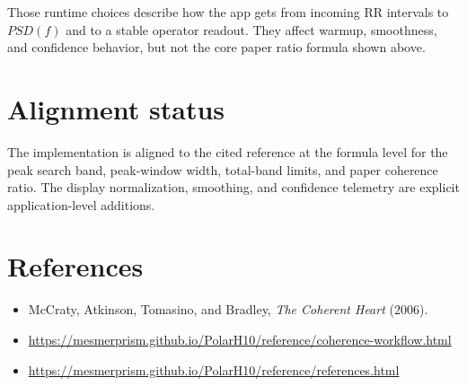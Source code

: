 \documentclass[11pt]{article}
\begin{document}
Those runtime choices describe how the app gets from incoming RR intervals to
$PSD(f)$ and to a stable operator readout. They affect warmup, smoothness, and
confidence behavior, but not the core paper ratio formula shown above.

\section*{Alignment status}

The implementation is aligned to the cited reference at the formula level for
the peak search band, peak-window width, total-band limits, and paper coherence
ratio. The display normalization, smoothing, and confidence telemetry are
explicit application-level additions.

\section*{References}

\begin{itemize}[leftmargin=1.5em]
\item McCraty, Atkinson, Tomasino, and Bradley, \emph{The Coherent Heart} (2006).
\item \url{https://mesmerprism.github.io/PolarH10/reference/coherence-workflow.html}
\item \url{https://mesmerprism.github.io/PolarH10/reference/references.html}
\end{itemize}
\end{document}

